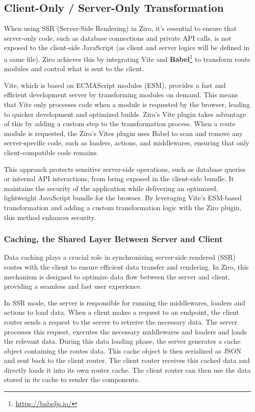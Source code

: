 \subsection{Client-Only / Server-Only Transformation}

When using SSR (Server-Side Rendering) in Ziro, it's essential to ensure that server-only code, such as database connections and private API calls, is not exposed to the client-side JavaScript (as client and server logics will be defined in a same file). Ziro achieves this by integrating Vite and \textbf{Babel}\footnote{\url{https://babeljs.io/}} to transform route modules and control what is sent to the client.

Vite, which is based on ECMAScript modules (ESM), provides a fast and efficient development server by transforming modules on demand. This means that Vite only processes code when a module is requested by the browser, leading to quicker development and optimized builds. Ziro's Vite plugin takes advantage of this by adding a custom step to the transformation process. When a route module is requested, the Ziro's Vites plugin uses Babel to scan and remove any server-specific code, such as loaders, actions, and middlewares, ensuring that only client-compatible code remains.

This approach protects sensitive server-side operations, such as database queries or internal API interactions, from being exposed in the client-side bundle. It maintains the security of the application while delivering an optimized, lightweight JavaScript bundle for the browser. By leveraging Vite's ESM-based transformation and adding a custom transformation logic with the Ziro plugin, this method enhances security.


\subsubsection{Caching, the Shared Layer Between Server and Client}

Data caching plays a crucial role in synchronizing server-side rendered (SSR) routes with the client to ensure efficient data transfer and rendering. In Ziro, this mechanism is designed to optimize data flow between the server and client, providing a seamless and fast user experience.

In SSR mode, the server is responsible for running the middlewares, loaders and actions to load data. When a client makes a request to an endpoint, the client router sends a request to the server to retreive the necessary data. The server processes this request, executes the necessary middlewares and loaders and loads the relevant data. During this data loading phase, the server generates a cache object containing the routes data. This cache object is then serialized as JSON and sent back to the client router. The client router receives this cached data and directly loads it into its own router cache. The client router can then use the data stored in its cache to render the components.


